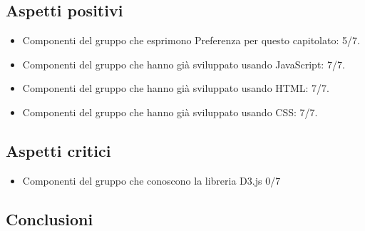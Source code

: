 \subsection{Aspetti positivi}
\begin{itemize}
\item Componenti del gruppo che esprimono Preferenza per questo capitolato: 5/7.
\item Componenti del gruppo che hanno già sviluppato usando JavaScript: 7/7.
\item Componenti del gruppo che hanno già sviluppato usando HTML: 7/7.
\item Componenti del gruppo che hanno già sviluppato usando CSS: 7/7.
\end{itemize}

\subsection{Aspetti critici}
\begin{itemize}
\item Componenti del gruppo che conoscono la libreria D3.js 0/7
\end{itemize}

\subsection{Conclusioni}